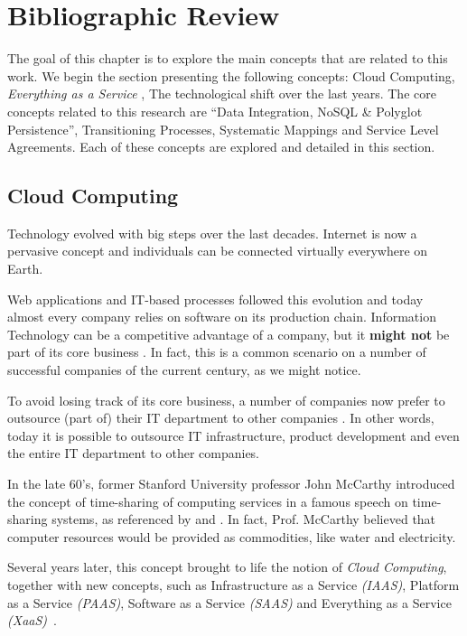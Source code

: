 \chapter{Bibliographic Review}\label{bibreviewChap}

The goal of this chapter is to explore the main concepts that are related to this work. We begin the section presenting the following concepts: Cloud Computing, \textit{Everything as a Service} , The technological shift over the last years. The core concepts related to this research are ``Data Integration, NoSQL \& Polyglot Persistence'', Transitioning Processes, Systematic Mappings and Service Level Agreements. Each of these concepts are explored and detailed in this section.

\section{Cloud Computing}

Technology evolved with big steps over the last decades. Internet is now a pervasive concept and individuals can be connected virtually everywhere on Earth. \cite{Armbrust09m.:above}

Web applications and IT-based processes followed this evolution and today almost every company relies on software on its production chain. Information Technology can be a competitive advantage of a company, but it \textbf{might not}  be part of its core business \cite{powell1997information}. In fact, this is a common scenario on a number of successful companies of the current century, as we might notice.

To avoid losing track of its core business, a number of companies now prefer to outsource (part of) their IT department to other companies \cite{quinn2013technology}. In other words, today it is possible to outsource IT infrastructure, product development and even the entire IT department to other companies.

In the late 60's, former Stanford University professor John McCarthy introduced the concept of time-sharing of computing services in a famous speech on time-sharing systems, as referenced by \cite{brendon} and \cite{wiki:mccarthy}. In fact, Prof. McCarthy believed that computer resources would be provided as commodities, like water and electricity.

Several years later, this concept brought to life the notion of \textit{Cloud Computing}, together with new concepts, such as Infrastructure as a Service \textit{(IAAS)}, Platform as a Service \textit{(PAAS)}, Software as a Service \textit{(SAAS)} and Everything as a Service \textit{(XaaS)}~\cite{AViewOfCloudComputing}.

